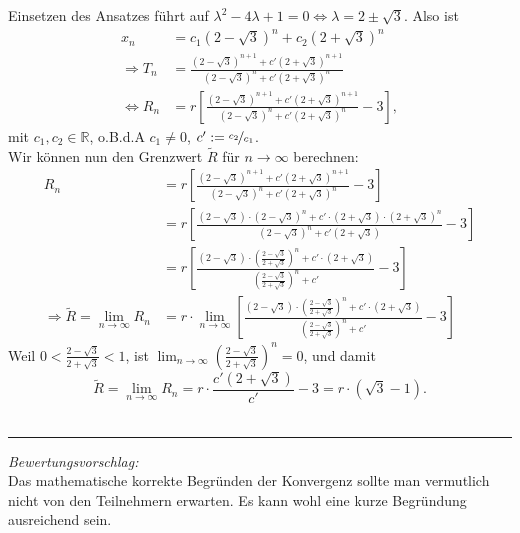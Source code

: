 \begin{Answer}[ref = recres]
	Einsetzen des Ansatzes führt auf $\lambda^2 - 4 \lambda + 1 = 0 \Leftrightarrow \lambda = 2\pm \sqrt{3}$. Also ist 
	\begin{align*}
		x_n &= c_1 \left(2-\sqrt{3}\right)^n + c_2 \left(2+\sqrt{3}\right)^n\\
		\Rightarrow T_n &= \frac{\left(2-\sqrt{3}\right)^{n+1} + c'\left(2+\sqrt{3}\right)^{n+1}}{\left(2-\sqrt{3}\right)^{n} + c'\left(2+\sqrt{3}\right)^{n}}\\
		\Leftrightarrow R_n &= r\left[\frac{\left(2-\sqrt{3}\right)^{n+1} + c'\left(2+\sqrt{3}\right)^{n+1}}{\left(2-\sqrt{3}\right)^{n} + c'\left(2+\sqrt{3}\right)^{n}}-3\right],
	\end{align*}
	mit $c_1,c_2\in \mathbb{R}$, o.B.d.A $c_1\neq 0$, $c':= \nicefrac{c_2}{c_1}$.\\
	Wir können nun den Grenzwert $\tilde{R}$ für $n\to\infty$ berechnen:
	\begin{align*}
		R_{n} &= r\left[\frac{\left(2-\sqrt{3}\right)^{n+1} + c'\left(2+\sqrt{3}\right)^{n+1}}{\left(2-\sqrt{3}\right)^{n} + c'\left(2+\sqrt{3}\right)^{n}}-3\right]\\
		&= r\left[\frac{\left(2-\sqrt{3}\right) \cdot \left(2-\sqrt{3}\right)^n + c'\cdot \left(2+\sqrt{3}\right)\cdot \left(2+\sqrt{3}\right)^n}{\left(2-\sqrt{3}\right)^n + c' \left(2+\sqrt{3}\right)}-3\right]\\
		&= r\left[\frac{\left(2-\sqrt{3}\right) \cdot \left(\frac{2-\sqrt{3}}{2+\sqrt{3}}\right)^n + c'\cdot \left(2+\sqrt{3}\right)}{\left(\frac{2-\sqrt{3}}{2+\sqrt{3}}\right)^n + c' }-3\right]\\
	\Rightarrow \tilde{R} =  \lim_{n\to \infty} R_n &= r\cdot \lim_{n\to \infty}\left[\frac{\left(2-\sqrt{3}\right) \cdot \left(\frac{2-\sqrt{3}}{2+\sqrt{3}}\right)^n + c'\cdot \left(2+\sqrt{3}\right)}{\left(\frac{2-\sqrt{3}}{2+\sqrt{3}}\right)^n + c' }-3\right]
	\end{align*}
	Weil $0<\frac{2-\sqrt{3}}{2+\sqrt{3}}<1$, ist $\lim_{n\to \infty}\left(\frac{2-\sqrt{3}}{2+\sqrt{3}}\right)^n = 0$, und damit
	\begin{equation*}
	\boxed{
		\tilde{R} = \lim_{n \to \infty} R_n = r\cdot \frac{c'\left(2+\sqrt{3}\right)}{c'} - 3 = r\cdot \left( \sqrt{3}-1\right).
		}
	\end{equation*}
	\\
	\noindent\rule{\textwidth}{.75pt}
	\textit{Bewertungsvorschlag:}\\
	Das mathematische korrekte Begründen der Konvergenz sollte man vermutlich nicht von den Teilnehmern erwarten. Es kann wohl eine kurze Begründung ausreichend sein.\\

\end{Answer}
